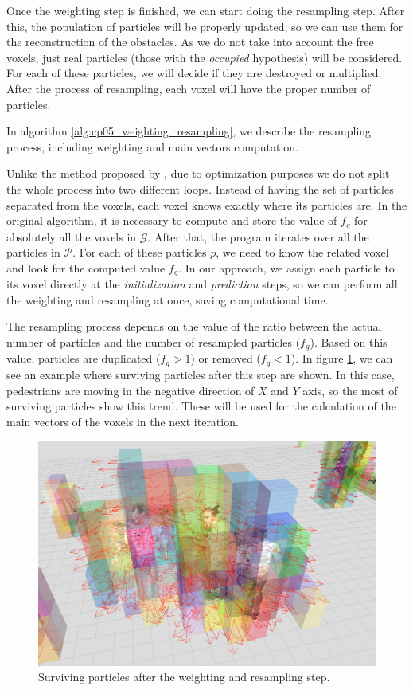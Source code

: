 Once the weighting step is finished, we can start doing the resampling step. After this, the population of particles will be properly updated, so we can use them for the reconstruction of the obstacles. As we do not take into account the free voxels, just real particles (those with the \emph{occupied} hypothesis) will be considered. For each of these particles, we will decide if they are destroyed or multiplied. After the process of resampling, each voxel will have the proper number of particles.

In algorithm \ref{alg:cp05_weighting_resampling}, we describe the resampling process, including weighting and main vectors computation.

Unlike the method proposed by \cite{danescu2012particle}, due to optimization purposes we do not split the whole process into two different loops. Instead of having the set of particles separated from the voxels, each voxel knows exactly where its particles are. In the original algorithm, it is necessary to compute and store the value of $f_g$ for absolutely all the voxels in $\mathcal{G}$. After that, the program iterates over all the particles in $\mathcal{P}$. For each of these particles $p$, we need to know the related voxel and look for the computed value $f_g$. In our approach, we assign each particle to its voxel directly at the \emph{initialization} and \emph{prediction} steps, so we can perform all the weighting and resampling at once, saving computational time.

The resampling process depends on the value of the ratio between the actual number of particles and the number of resampled particles ($f_g$). Based on this value, particles are duplicated ($f_g > 1$) or removed ($f_g < 1$). In figure \ref{fig:cp05_weight_and_resample}, we can see an example where surviving particles after this step are shown. In this case, pedestrians are moving in the negative direction of $X$ and $Y$ axis, so the most of surviving particles show this trend. These will be used for the calculation of the main vectors of the voxels in the next iteration.

\begin{figure}[t]
  \centering
  \includegraphics{weightAndResample}
  \caption{Surviving particles after the weighting and resampling step.}\label{fig:cp05_weight_and_resample}
\end{figure}

